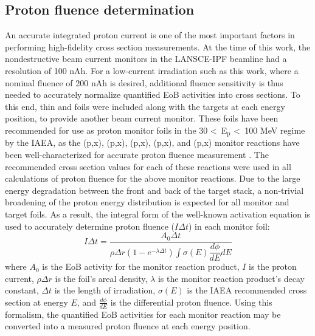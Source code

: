 \documentclass[3p]{elsarticle}
\newcommand{\pp}[1]{\left( #1\right)}
\newcommand{\comment}[1]{\todo[color=blue!20!white,inline]{ASV: #1}}
\begin{document}


\subsection{Proton fluence determination}\label{sec:dosimetry}



An accurate integrated proton current is one of the most important factors in performing high-fidelity cross section measurements.
At the time of this work, the nondestructive beam current monitors in the LANSCE-IPF beamline had a  resolution of 100 nAh.
For a low-current irradiation such as this work, where a nominal fluence of 200 nAh is desired, additional fluence sensitivity is thus needed to accurately normalize quantified EoB activities into cross sections.
To this end, thin  and  foils were included along with the  targets at each energy position, to provide another beam current monitor.
These foils have been recommended for use as proton monitor foils in the 30 \textless\ E$_\text{p}$ \textless\ 100 MeV regime by the IAEA, as the (p,x), (p,x), (p,x), (p,x), and (p,x) monitor reactions have been well-characterized for accurate proton fluence measurement \cite{gul2001charged}.
The recommended cross section values for each of these reactions were used in all calculations of proton fluence for the above monitor reactions.
Due to the large energy degradation between the front and  back of the target stack, a non-trivial broadening of the proton energy distribution is expected for all monitor and target foils.
As a result, the integral form of the well-known activation equation is used to accurately determine proton fluence ($I \Delta t $) in each monitor foil:
\begin{equation}
I \Delta t = \dfrac{A_0 \Delta t}{\rho \Delta r \pp{1-e^{-\lambda \Delta t}} \int \sigma\pp{E} \dfrac{d\phi}{dE} dE}
\end{equation}
where $A_0$ is the EoB activity for the monitor reaction product, $I$ is the proton current, $\rho \Delta r$ is the foil's areal density, $\lambda$ is the monitor reaction product's decay constant, $\Delta t$ is the length of irradiation, $\sigma\pp{E}$ is the IAEA recommended cross section at energy $E$, and $\frac{d\phi}{dE}$ is the differential proton fluence.
Using this formalism, the quantified EoB activities for each monitor reaction may be converted into a measured proton fluence at each energy position.
\end{document}

